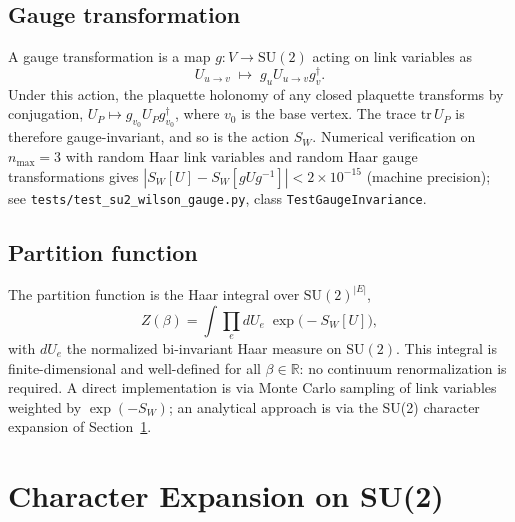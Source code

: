\documentclass[11pt]{article}
\begin{document}
\subsection{Gauge transformation}

A gauge transformation is a map $g: V \to \mathrm{SU}(2)$ acting on
link variables as
\begin{equation}
U_{u \to v} \; \longmapsto \; g_u U_{u \to v} g_v^{\dagger}.
\label{eq:gauge_transform}
\end{equation}
Under this action, the plaquette holonomy of any closed plaquette
transforms by conjugation, $U_P \mapsto g_{v_0} U_P g_{v_0}^{\dagger}$,
where $v_0$ is the base vertex.  The trace
$\mathrm{tr}\,U_P$ is therefore gauge-invariant, and so is the action
$S_W$.  Numerical verification on $n_{\max} = 3$ with random Haar link
variables and random Haar gauge transformations gives
$|S_W[U] - S_W[g U g^{-1}]| < 2 \times 10^{-15}$ (machine precision);
see \texttt{tests/test\_su2\_wilson\_gauge.py}, class
\texttt{TestGaugeInvariance}.

\subsection{Partition function}

The partition function is the Haar integral over
$\mathrm{SU}(2)^{|E|}$,
\begin{equation}
Z(\beta) = \int \prod_{e} dU_e \; \exp\bigl(-S_W[U]\bigr),
\label{eq:partition_function}
\end{equation}
with $dU_e$ the normalized bi-invariant Haar measure on
$\mathrm{SU}(2)$.  This integral is finite-dimensional and
well-defined for all $\beta \in \mathbb{R}$: no continuum
renormalization is required.  A direct implementation is via Monte
Carlo sampling of link variables weighted by $\exp(-S_W)$; an
analytical approach is via the SU(2) character expansion of
Section~\ref{sec:characters}.

\section{Character Expansion on SU(2)}
\label{sec:characters}
\end{document}
